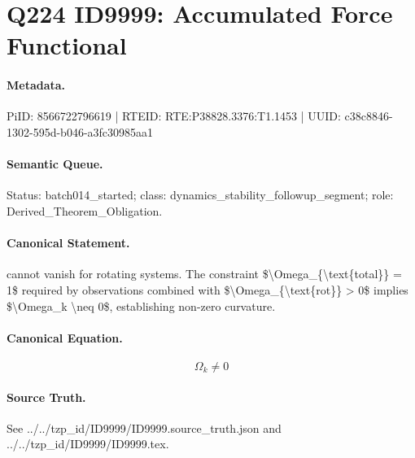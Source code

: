 \section*{Q224 ID9999: Accumulated Force Functional}
\paragraph{Metadata.}
PiID: 8566722796619 | RTEID: RTE:P38828.3376:T1.1453 | UUID: c38c8846-1302-595d-b046-a3fc30985aa1

\paragraph{Semantic Queue.}
Status: batch014\_started; class: dynamics\_stability\_followup\_segment; role: Derived\_Theorem\_Obligation.

\paragraph{Canonical Statement.}
cannot vanish for rotating systems. The constraint \$\textbackslash{}Omega\_\{\textbackslash{}text\{total\}\} = 1\$ required by observations combined with \$\textbackslash{}Omega\_\{\textbackslash{}text\{rot\}\} > 0\$ implies \$\textbackslash{}Omega\_k \textbackslash{}neq 0\$, establishing non-zero curvature.

\paragraph{Canonical Equation.}
\[
\Omega_k \neq 0
\]

\paragraph{Source Truth.}
See ../../tzp\_id/ID9999/ID9999.source\_truth.json and ../../tzp\_id/ID9999/ID9999.tex.
